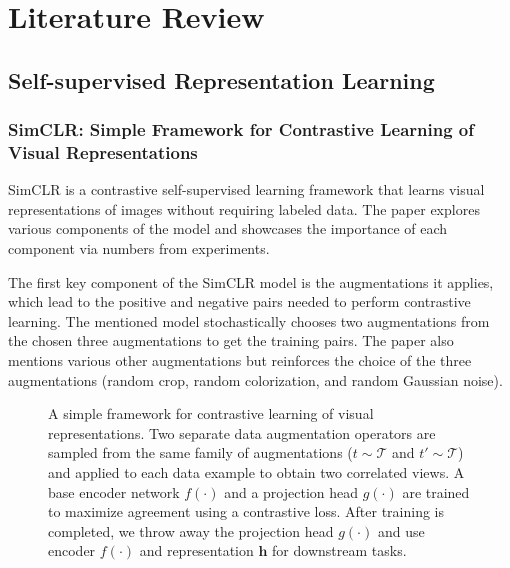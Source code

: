 \section{Literature Review}
\label{sec:related_work}

\subsection{Self-supervised Representation Learning}
\subsubsection{SimCLR: Simple Framework for Contrastive Learning of Visual Representations}
SimCLR\cite{chen2020simple} is a contrastive self-supervised learning framework that learns visual representations of images without requiring labeled data. The paper explores various components of the model and showcases the importance of each component via numbers from experiments.

The first key component of the SimCLR model is the augmentations it applies, which lead to the positive and negative pairs needed to perform contrastive learning. The mentioned model stochastically chooses two augmentations from the chosen three augmentations to get the training pairs. The paper also mentions various other augmentations but reinforces the choice of the three augmentations (random crop, random colorization, and random Gaussian noise).

\begin{figure}[h]
\small
    \centering
{}
    \caption{A simple framework for contrastive learning of visual representations. 
    Two separate data augmentation operators are sampled from the same family of augmentations ($t\sim \mathcal{T}$ and $t'\sim \mathcal{T}$) and applied to each data example to obtain two correlated views.
    A base encoder network $f(\cdot)$ and a projection head $g(\cdot)$ are trained to maximize agreement using a contrastive loss. After training is completed, we throw away the projection head $g(\cdot)$ and use encoder $f(\cdot)$ and representation $\bm h$ for downstream tasks.}
    \label{fig:framework}
\end{figure}

